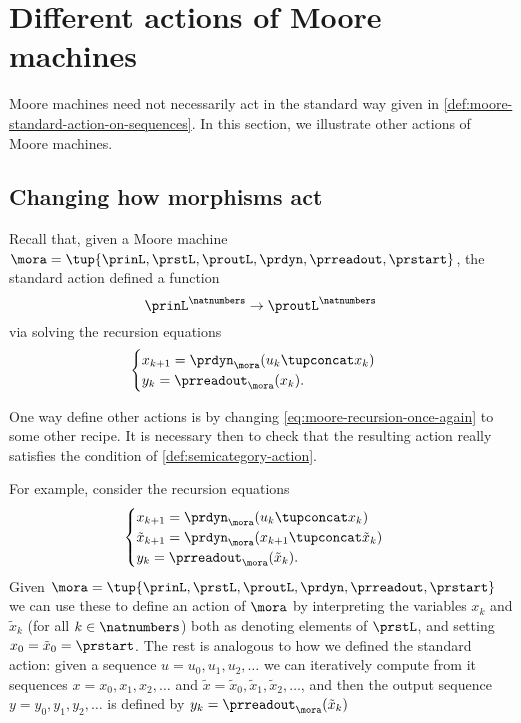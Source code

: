 
\section{Different actions of Moore machines}
\label{sec:different-actions-of-moore-machines}


Moore machines need not necessarily act in the standard way given in \cref{def:moore-standard-action-on-sequences}. In this section, we illustrate other actions of Moore machines. 

\subsection{Changing how morphisms act}

Recall that, given a Moore machine $\mora = \tup{\prinL,\prstL,\proutL,\prdyn,\prreadout,\prstart}$, the standard action defined a function 
\begin{equation}
{\prinL}^\natnumbers \to {\proutL}^\natnumbers
\end{equation}
via solving the recursion equations 
\begin{equation}
\label{eq:moore-recursion-once-again}
    \begin{cases}
        x_{k+1} = \prdyn_\mora(u_k \tupconcat x_k) \\
        y_{k}   = \prreadout_\mora(x_{k}).
    \end{cases}
\end{equation}

One way define other actions is by changing \cref{eq:moore-recursion-once-again} to some other recipe. It is necessary then to check that the resulting action really satisfies the condition of \cref{def:semicategory-action}. 

For example, consider the recursion equations
\begin{equation}
\label{eq:moore-new-recursion-equations}
    \begin{cases}
        x_{k+1} = \prdyn_\mora(u_k \tupconcat x_k) \\
        \tilde x_{k+1} = \prdyn_\mora(x_{k+1} \tupconcat \tilde x_k) \\
        y_{k}   = \prreadout_\mora(\tilde x_{k}).
    \end{cases}
\end{equation}
Given  $\mora = \tup{\prinL,\prstL,\proutL,\prdyn,\prreadout,\prstart}$ we can use these to define an action of $\mora$ by interpreting the variables $x_k$ and $\tilde x_k$ (for all $k \in \natnumbers$) both as denoting elements of $\prstL$, and setting $x_0 = \tilde x_0 = \prstart$. The rest is analogous to how we defined the standard action: given a sequence $u = u_0, u_1, u_2, \dots$ we can iteratively compute from it sequences $x = x_0, x_1, x_2, \dots $ and $\tilde x = \tilde x_0, \tilde x_1, \tilde x_2, \dots$, and then the output sequence $y = y_0, y_1, y_2, \dots $ is defined by $y_{k}   = \prreadout_\mora(\tilde x_{k})$


